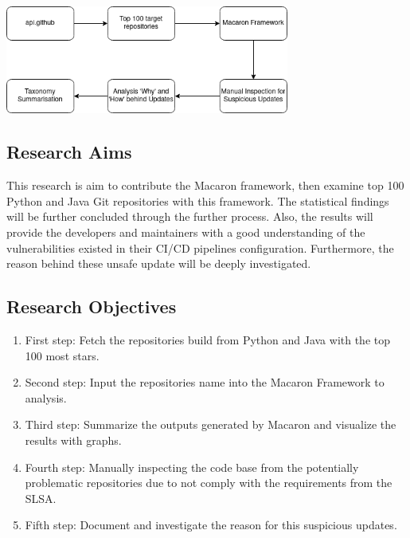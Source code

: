 \begin{center}
    \includegraphics[width=0.7\textwidth]{./screenshot/research_flow.png}
\end{center}

\subsection{Research Aims}
This research is aim to contribute the Macaron framework, then examine top 100 Python and Java Git 
repositories with this framework. The statistical findings will be further concluded through the further process.
Also, the results will provide the developers and maintainers with a good understanding 
of the vulnerabilities existed in their CI/CD pipelines configuration. Furthermore, the reason behind
these unsafe update will be deeply investigated.

\subsection{Research Objectives}
\begin{enumerate}
    \item First step: Fetch the repositories build from Python and Java with the top 100 most stars.
    \item Second step: Input the repositories name into the Macaron Framework to analysis. 
    \item Third step: Summarize the outputs generated by Macaron and visualize the results with graphs.
    \item Fourth step: Manually inspecting the code base from the potentially problematic repositories 
    due to not comply with the requirements from the SLSA.
    \item Fifth step: Document and investigate the reason for this suspicious updates.  
\end{enumerate}
